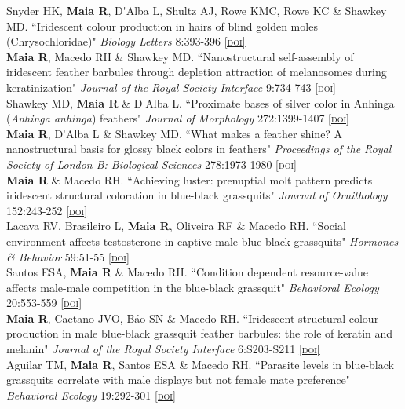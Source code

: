 \documentclass[10pt]{article}
\newcommand{\doi}[1]{\href{http://dx.doi.org/#1}{\scriptsize\textsc{[doi]}}}
\newcommand{\years}[1]{\marginnote{\raggedleft\scriptsize #1}}
\begin{document}
\years{} Snyder HK,  \textbf{Maia R}, D\'{}Alba L, Shultz AJ, Rowe KMC, Rowe KC \& Shawkey MD. “Iridescent colour production in hairs of blind golden moles (Chrysochloridae)" \emph{Biology Letters} 8:393-396 \doi{10.1098/rsbl.2011.1168}\\

\years{}  \textbf{Maia R}, Macedo RH \& Shawkey MD. “Nanostructural self-assembly of iridescent feather barbules through depletion attraction of melanosomes during keratinization" \emph{Journal of the Royal Society Interface} 9:734-743 \doi{10.1098/rsif.2011.0456}\\

\years{2011} Shawkey MD,  \textbf{Maia R} \& D\'{}Alba L. “Proximate bases of silver color in Anhinga (\emph{Anhinga anhinga}) feathers" \emph{Journal of Morphology} 272:1399-1407 \doi{10.1002/jmor.10993}\\

\years{}  \textbf{Maia R}, D\'{}Alba L \& Shawkey MD. “What makes a feather shine? A nanostructural basis for glossy black colors in feathers" \emph{Proceedings of the Royal Society of London B: Biological Sciences} 278:1973-1980 \doi{10.1098/rspb.2010.1637}\\

\years{}  \textbf{Maia R} \& Macedo RH. “Achieving luster: prenuptial molt pattern predicts iridescent structural coloration in blue-black grassquits" \emph{Journal of Ornithology} 152:243-252 \doi{10.1007/s10336-010-0576-y}\\

\years{2010} Lacava RV, Brasileiro L,  \textbf{Maia R}, Oliveira RF \& Macedo RH. “Social environment affects testosterone in captive male blue-black grassquits" \emph{Hormones \& Behavior} 59:51-55 \doi{10.1016/j.yhbeh.2010.10.003}\\

\years{2009} Santos ESA,  \textbf{Maia R} \& Macedo RH. “Condition dependent resource-value affects male-male competition in the blue-black grassquit" \emph{Behavioral Ecology} 20:553-559 \doi{10.1093/beheco/arp031}\\

\years{}  \textbf{Maia R}, Caetano JVO, B\'{a}o SN \& Macedo RH. “Iridescent structural colour production in male blue-black grassquit feather barbules: the role of keratin and melanin" \emph{Journal of the Royal Society Interface} 6:S203-S211 \doi{10.1098/rsif.2008.0460.focus}\\

\years{2008} Aguilar TM,  \textbf{Maia R}, Santos ESA \& Macedo RH. “Parasite levels in blue-black grassquits correlate with male displays but not female mate preference" \emph{Behavioral Ecology} 19:292-301 \doi{10.1093/beheco/arm130}\\
\end{document}
